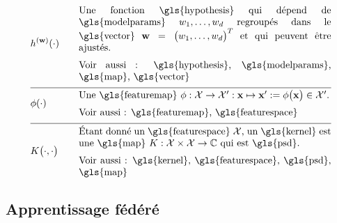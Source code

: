 \begin{align}
	& \hypothesis^{(\weights)}(\cdot) & \quad & \parbox{.75\textwidth}{
	Une fonction \gls{hypothesis} qui dépend de \gls{modelparams} $\weight_{1},\ldots,\weight_{\featuredim}$ regroupés dans le \gls{vector} $\weights=\big(\weight_{1},\ldots,\weight_{\featuredim} \big)^{T}$ et qui peuvent être ajustés. \\
	[2mm] Voir aussi : \gls{hypothesis}, \gls{modelparams}, \gls{map}, \gls{vector}
	} \nonumber \\[2mm] \hline \nonumber\\[-5mm]
	& \featuremap(\cdot) & \quad & \parbox{.75\textwidth}{
		Une \gls{featuremap} $\featuremap: \featurespace \rightarrow \featurespace' : \featurevec \mapsto \featurevec' \defeq \featuremap\big( \featurevec \big) \in \featurespace'$. \\
		[2mm] Voir aussi : \gls{featuremap}, \gls{featurespace}
	} \nonumber \\[2mm] \hline \nonumber\\[-5mm]
	& \kernelmap{\cdot}{\cdot} & \quad & \parbox{.75\textwidth}{
		Étant donné un \gls{featurespace} $\featurespace$, un \gls{kernel} est une \gls{map} $\kernel: \featurespace \times \featurespace \rightarrow \mathbb{C}$ qui est \gls{psd}. \\
		[2mm] Voir aussi : \gls{kernel}, \gls{featurespace}, \gls{psd}, \gls{map}
	} \nonumber
\end{align}
            

\newpage
\subsection*{Apprentissage fédéré}

